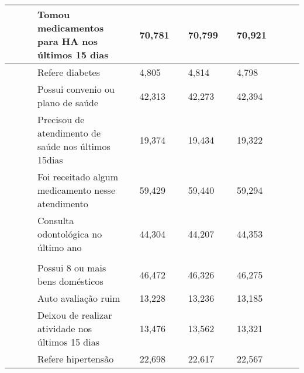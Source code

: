 \documentclass{article}
\begin{document}
\begin{tabular}{| l | l | l | l | l | l | l | l | l || l | l | l | l |}
 & 
 & %
 & Tomou medicamentos para HA nos últimos 15 dias
 & %
 & 70,781
 & %
 & 70,799
 & %
 & 70,921
\\ \hline 

 & 
 & %
 & Refere diabetes
 & %
 & 4,805
 & %
 & 4,814
 & %
 & 4,798
\\ \hline 

 & 
 & %
 & Possui convenio ou plano de saúde
 & %
 & 42,313
 & %
 & 42,273
 & %
 & 42,394
\\ \hline 

 & 
 & %
 & Precisou de atendimento de saúde nos últimos 15dias
 & %
 & 19,374
 & %
 & 19,434
 & %
 & 19,322
\\ \hline 

 & 
 & %
 & Foi receitado algum medicamento nesse atendimento
 & %
 & 59,429
 & %
 & 59,440
 & %
 & 59,294
\\ \hline 

 & 
 & %
 & Consulta odontológica no último ano
 & %
 & 44,304
 & %
 & 44,207
 & %
 & 44,353
\\ \hline 

 & \multirow{1}{*}{\multicolumn{2}{l}{Adultos e idosos}}
 & %
 & 
 & %
 & 
\\ \hline 

 & 
 & %
 & Possui 8 ou mais bens domésticos
 & %
 & 46,472
 & %
 & 46,326
 & %
 & 46,275
\\ \hline 

 & 
 & %
 & Auto avaliação ruim
 & %
 & 13,228
 & %
 & 13,236
 & %
 & 13,185
\\ \hline 

 & 
 & %
 & Deixou de realizar atividade nos últimos 15 dias
 & %
 & 13,476
 & %
 & 13,562
 & %
 & 13,321
\\ \hline 

 & 
 & %
 & Refere hipertensão
 & %
 & 22,698
 & %
 & 22,617
 & %
 & 22,567
\\ \hline 


\end{tabular}
\end{document}
